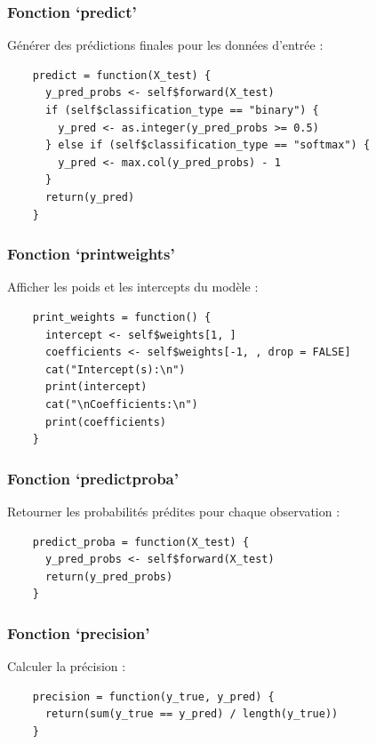 \documentclass[10pt,french]{report}
\begin{document}
	\subsubsection{Fonction \enquote*{predict}}

    Générer des prédictions finales pour les données d’entrée :
    \begin{verbatim}
    predict = function(X_test) {
      y_pred_probs <- self$forward(X_test)
      if (self$classification_type == "binary") {
        y_pred <- as.integer(y_pred_probs >= 0.5)
      } else if (self$classification_type == "softmax") {
        y_pred <- max.col(y_pred_probs) - 1
      }
      return(y_pred)
    }
    \end{verbatim}

    \subsubsection{Fonction \enquote*{print\textunderscore weights}}

    Afficher les poids et les intercepts du modèle :
    \begin{verbatim}
    print_weights = function() {
      intercept <- self$weights[1, ]
      coefficients <- self$weights[-1, , drop = FALSE]
      cat("Intercept(s):\n")
      print(intercept)
      cat("\nCoefficients:\n")
      print(coefficients)
    }
    \end{verbatim}

    \subsubsection{Fonction \enquote*{predict\textunderscore proba}}

    Retourner les probabilités prédites pour chaque observation :
    \begin{verbatim}
    predict_proba = function(X_test) {
      y_pred_probs <- self$forward(X_test)
      return(y_pred_probs)
    }
    \end{verbatim}

    \subsubsection{Fonction \enquote*{precision}}

    Calculer la précision :
    \begin{verbatim}
    precision = function(y_true, y_pred) {
      return(sum(y_true == y_pred) / length(y_true))
    }
    \end{verbatim}
\end{document}
